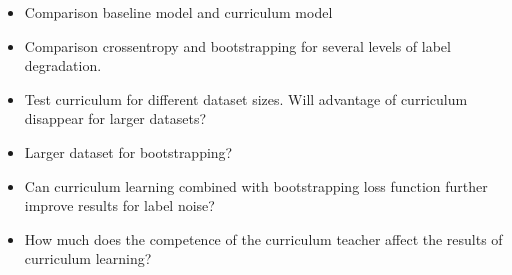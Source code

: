 \begin{itemize}
\item Comparison baseline model and curriculum model
\item Comparison crossentropy and bootstrapping for several
levels of label degradation. 
\item Test curriculum for different dataset sizes. Will advantage of curriculum disappear for larger datasets?
\item Larger dataset for bootstrapping?
\item Can curriculum learning combined with bootstrapping loss function further improve results for label noise?
\item How much does the competence of the curriculum teacher affect the results of curriculum learning?
\end{itemize}



